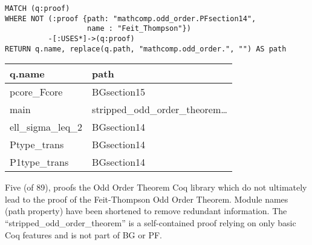 \begin{verbatim}
MATCH (q:proof) 
WHERE NOT (:proof {path: "mathcomp.odd_order.PFsection14",
                   name : "Feit_Thompson"})
          -[:USES*]->(q:proof)
RETURN q.name, replace(q.path, "mathcomp.odd_order.", "") AS path
\end{verbatim}

\centering

\begin{tabular*}{\textwidth}{@{\extracolsep{\fill}} ll}

  \toprule

	\textbf{q.name}	& \textbf{path} \\

	\midrule

	pcore\_Fcore     & BGsection15 \\
	main            & stripped\_odd\_order\_theorem\ldots\\
	ell\_sigma\_leq\_2 & BGsection14 \\
	Ptype\_trans     & BGsection14 \\
	P1type\_trans    & BGsection14 \\

  \bottomrule

\end{tabular*}

\bigskip
\caption{Five (of 89), proofs the Odd Order Theorem Coq library which do not
  ultimately lead to the proof of the Feit-Thompson Odd Order Theorem. Module
  names (path property) have been shortened to remove redundant
  information. The ``stripped\_odd\_order\_theorem'' is a self-contained proof
  relying on only basic Coq features and is not part of BG or
  PF.}\label{table:oot:leadto}
